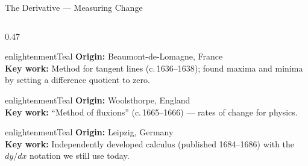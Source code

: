 \begin{frame}[shrink=25]{The Derivative --- Measuring Change}

  \begin{columns}[T]
    \begin{column}{0.47\textwidth}
      \begin{personbox}{enlightenmentTeal}
        \small
        \textbf{Origin:} Beaumont-de-Lomagne, France\\
        \textbf{Key work:} Method for tangent lines (c.\,1636--1638);
        found maxima and minima by setting a difference quotient to zero.
      \end{personbox}

      \vspace{0.2em}
      \begin{personbox}{enlightenmentTeal}
        \small
        \textbf{Origin:} Woolsthorpe, England\\
        \textbf{Key work:} ``Method of fluxions'' (c.\,1665--1666) ---
        rates of change for physics.
      \end{personbox}

      \vspace{0.2em}
      \begin{personbox}[G.\ W.\ Leibniz (1646--1716)]{enlightenmentTeal}
        \small
        \textbf{Origin:} Leipzig, Germany\\
        \textbf{Key work:} Independently developed calculus (published 1684--1686)
        with the $dy/dx$ notation we still use today.
      \end{personbox}
    \end{column}


\end{columns}
\end{frame}
